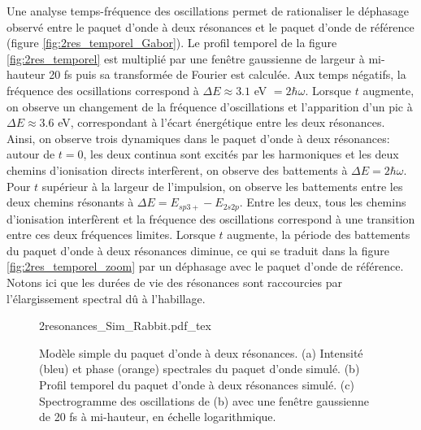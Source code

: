 Une analyse temps-fréquence des oscillations permet de rationaliser le déphasage observé entre le paquet d'onde à deux résonances et le paquet d'onde de référence (figure \ref{fig:2res_temporel_Gabor}). Le profil temporel de la figure \ref{fig:2res_temporel} est multiplié par une fenêtre gaussienne de largeur à mi-hauteur 20 fs puis sa transformée de Fourier est calculée. Aux temps négatifs, la fréquence des ocsillations correspond à $\Delta E \approx 3.1$ eV $= 2 \hbar \omega$. Lorsque $t$ augmente, on observe un changement de la fréquence d'oscillations et l'apparition d'un pic à $\Delta E \approx 3.6$ eV, correspondant à l'écart énergétique entre les deux résonances. Ainsi, on observe trois dynamiques dans le paquet d'onde à deux résonances: autour de $t = 0$, les deux continua sont excités par les harmoniques et les deux chemins d'ionisation directs interfèrent, on observe des battements à $\Delta E = 2 \hbar \omega$. Pour $t$ supérieur à la largeur de l'impulsion, on observe les battements entre les deux chemins résonants à $\Delta E = E_{sp3+} - E_{2s2p}$. Entre les deux, tous les chemins d'ionisation interfèrent et la fréquence des oscillations correspond à une transition entre ces deux fréquences limites. Lorsque $t$ augmente, la période des battements du paquet d'onde à deux résonances diminue, ce qui se traduit dans la figure \ref{fig:2res_temporel_zoom} par un déphasage avec le paquet d'onde de référence. Notons ici que les durées de vie des résonances sont raccourcies par l'élargissement spectral dû à l'habillage.

\begin{figure}
\centering
\def\svgwidth{\textwidth}
{2resonances_Sim_Rabbit.pdf_tex}
\caption{Modèle simple du paquet d'onde à deux résonances. (a) Intensité (bleu) et phase (orange) spectrales du paquet d'onde simulé. (b) Profil temporel du paquet d'onde à deux résonances simulé. (c) Spectrogramme des oscillations de (b) avec une fenêtre gaussienne de 20 fs à mi-hauteur, en échelle logarithmique.}
\label{fig:2resonances_Sim_Rabbit}
\end{figure}

